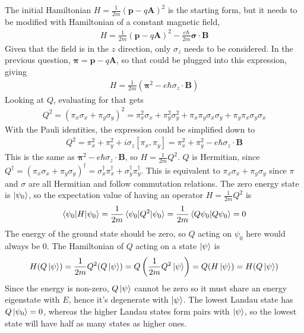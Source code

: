 \documentclass[10pt,letterpaper]{article}
\begin{document}
\begin{enumerate}
\color{violet}
The initial Hamiltonian $H = \frac{1}{2m}(\textbf{p} - q\textbf{A})^{2}$ is the starting form, but it needs to be modified with Hamiltonian of a constant magnetic field,
\begin{gather*}
H = \frac{1}{2m}(\textbf{p} - q\textbf{A})^{2} - \frac{e\hbar}{2m}\boldsymbol{\sigma} \cdot \textbf{B}
\end{gather*}
Given that the field is in the $z$ direction, only $\sigma_{z}$ needs to be considered. In the previous question, $\boldsymbol{\pi} = \textbf{p} - q\textbf{A}$, so that could be plugged into this expression, giving
\begin{gather*}
H = \frac{1}{2m}(\boldsymbol{\pi}^{2} - e\hbar\sigma_{z} \cdot \textbf{B})
\end{gather*}
Looking at $Q$, evaluating for that gets
\begin{gather*}
Q^{2} = (\pi_{x}\sigma_{x} + \pi_{y}\sigma_{y})^{2} = \pi_{x}^{2}\sigma_{x} + \pi_{y}^{2}\sigma_{y}^{2} + \pi_{x}\pi_{y}\sigma_{x}\sigma_{y} + \pi_{y}\pi_{x}\sigma_{y}\sigma_{x}
\end{gather*}
With the Pauli identities, the expression could be simplified down to
\begin{gather*}
Q^{2} = \pi_{x}^{2} + \pi_{y}^{2} + i\sigma_{z}[\pi_{x}, \pi_{y}] = \pi_{x}^{2} + \pi_{y}^{2} - e\hbar\sigma_{z} \cdot \textbf{B}
\end{gather*}
This is the same as $\boldsymbol{\pi}^{2} - e\hbar\sigma_{z} \cdot \textbf{B}$, so $H = \frac{1}{2m}Q^{2}$. $Q$ is Hermitian, since $Q^{\dagger} = (\pi_{x}\sigma_{x} + \pi_{y}\sigma_{y})^{\dagger} = \sigma_{x}^{\dagger}\pi_{x}^{\dagger} + \sigma_{y}^{\dagger}\pi_{y}^{\dagger}$. This is equivalent to $\pi_{x}\sigma_{x} + \pi_{y}\sigma_{y}$ since $\pi$ and $\sigma$ are all Hermitian and follow commutation relations. The zero energy state is $\ket{\psi_{0}}$, so the expectation value of having an operator $H = \frac{1}{2m}Q^{2}$ is
\begin{gather*}
\braket{\psi_{0} | H | \psi_{0}} = \frac{1}{2m} \braket{\psi_{0} | Q^{2} | \psi_{0}} = \frac{1}{2m} \braket{Q\psi_{0} | Q\psi_{0}} = 0
\end{gather*} 
The energy of the ground state should be zero, so $Q$ acting on $\psi_{0}$ here would always be 0. The Hamiltonian of $Q$ acting on a state $\ket{\psi}$ is
\begin{gather*}
H(Q\ket{\psi}) = \frac{1}{2m}Q^{2}(Q\ket{\psi}) = Q\left( \frac{1}{2m} Q^{2}\ket{\psi} \right) = Q(H\ket{\psi}) = H(Q\ket{\psi})
\end{gather*}
Since the energy is non-zero, $Q\ket{\psi}$ cannot be zero so it must share an energy eigenstate with $E$, hence it's degenerate with $\ket{\psi}$. The lowest Landau state has $Q\ket{\psi_{0}} = 0$, whereas the higher Landau states form pairs with $\ket{\psi}$, so the lowest state will have half as many states as higher ones. 
\color{black}

\end{enumerate}
	
\end{document}
